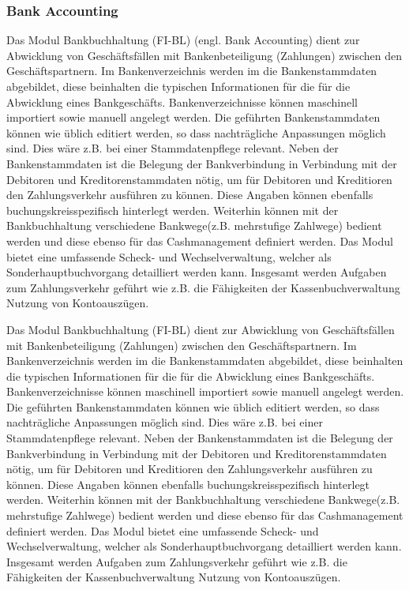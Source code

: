 \subsubsection{Bank Accounting} %
Das Modul Bankbuchhaltung (FI-BL) (engl. Bank Accounting) dient zur Abwicklung von Geschäftsfällen mit Bankenbeteiligung (Zahlungen) zwischen den Geschäftspartnern. 
Im Bankenverzeichnis werden im die Bankenstammdaten abgebildet, diese beinhalten die typischen Informationen für die für die Abwicklung eines Bankgeschäfts. Bankenverzeichnisse können maschinell importiert sowie manuell angelegt werden. Die geführten Bankenstammdaten können wie üblich editiert werden, so dass nachträgliche Anpassungen möglich sind. Dies wäre z.B. bei einer Stammdatenpflege relevant. Neben der Bankenstammdaten ist die Belegung der Bankverbindung in Verbindung mit der Debitoren und Kreditorenstammdaten nötig, um für Debitoren und Kreditioren den Zahlungsverkehr ausführen zu können. Diese Angaben können ebenfalls buchungskreisspezifisch hinterlegt werden. 
Weiterhin können mit der Bankbuchhaltung verschiedene Bankwege(z.B. mehrstufige Zahlwege) bedient werden und diese ebenso für das Cashmanagement definiert werden. Das Modul bietet eine umfassende Scheck- und Wechselverwaltung, welcher als Sonderhauptbuchvorgang detailliert werden kann. Insgesamt werden Aufgaben zum Zahlungsverkehr geführt wie z.B. die Fähigkeiten der Kassenbuchverwaltung Nutzung von Kontoauszügen.

Das Modul Bankbuchhaltung (FI-BL) dient zur Abwicklung von Geschäftsfällen mit Bankenbeteiligung (Zahlungen) zwischen den Geschäftspartnern. Im Bankenverzeichnis werden im die Bankenstammdaten abgebildet, diese beinhalten die typischen Informationen für die für die Abwicklung eines Bankgeschäfts. Bankenverzeichnisse können maschinell importiert sowie manuell angelegt werden. Die geführten Bankenstammdaten können wie üblich editiert werden, so dass nachträgliche Anpassungen möglich sind. Dies wäre z.B. bei einer Stammdatenpflege relevant. Neben der Bankenstammdaten ist die Belegung der Bankverbindung in Verbindung mit der Debitoren und Kreditorenstammdaten nötig, um für Debitoren und Kreditioren den Zahlungsverkehr ausführen zu können. Diese Angaben können ebenfalls buchungskreisspezifisch hinterlegt werden. Weiterhin können mit der Bankbuchhaltung verschiedene Bankwege(z.B. mehrstufige Zahlwege) bedient werden und diese ebenso für das Cashmanagement definiert werden. Das Modul bietet eine umfassende Scheck- und Wechselverwaltung, welcher als Sonderhauptbuchvorgang detailliert werden kann. Insgesamt werden Aufgaben zum Zahlungsverkehr geführt wie z.B. die Fähigkeiten der Kassenbuchverwaltung Nutzung von Kontoauszügen.

